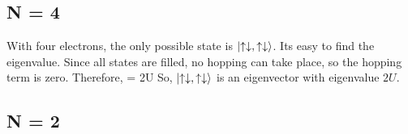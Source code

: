 \documentclass[12pt]{article}
\begin{document}
\subsection{N = 4}
With four electrons, the only possible state is \(\ket{\uparrow\downarrow,\uparrow\downarrow}\). Its easy to find the eigenvalue. Since all states are filled, no hopping can take place, so the hopping term is zero. Therefore,
\beq
\ham \ket{\uparrow\downarrow,\uparrow\downarrow} = 2U \ket{\uparrow\downarrow,\uparrow\downarrow}
\eeq
So, \(\ket{\uparrow\downarrow,\uparrow\downarrow}\) is an eigenvector with eigenvalue \(2U\).

\subsection{N = 2}
\end{document}
